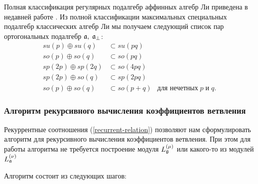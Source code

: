 Полная классификация регулярных подалгебр аффинных алгебр Ли приведена в недавней работе \cite{1751-8121-41-36-365204}. Из полной классификации максимальных специальных подалгебр классических алгебр Ли \cite{dynkin1952semisimple} мы получаем следующий список пар ортогональных подалгебр $\mathfrak{a},\;\mathfrak{a}_{\perp}$:
\begin{equation*}
\begin{array}{lll}
su(p)\oplus su(q) & \subset su(pq) &  \\
so(p)\oplus so(q) & \subset so(pq) &  \\
sp(2p)\oplus sp(2q) & \subset so(4pq) &  \\
sp(2p)\oplus so(q) & \subset sp(2pq) &  \\
so(p)\oplus so(q) & \subset so(p+q) & \text{для нечетных}\;p\;\text{и}\;q.
\end{array}
\end{equation*}


\subsubsection{Алгоритм рекурсивного вычисления коэффициентов ветвления}

\label{sec:algorithm}

Рекуррентные соотношения (\ref{recurrent-relation}) позволяют нам сформулировать алгоритм для рекурсивного вычисления коэффициентов ветвления. При этом для работы алгоритма не требуется построение модуля $L^{(\mu)}_{\mathfrak{g}}$ или какого-то из модулей $L^{(\nu)}_{\mathfrak{a}}$

Алгоритм состоит из следующих шагов:

